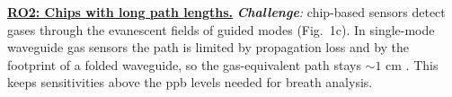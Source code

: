 \documentclass[a4paper,12pt]{article}
\begin{document}
%
%

\underline{\textbf{RO2: Chips with long path lengths.}}
\emph{\textbf{Challenge}:} chip-based sensors detect gases through the
evanescent fields of guided modes (Fig.~1c). In single-mode waveguide gas sensors the path is limited by propagation loss and by the footprint of a folded waveguide, so the gas-equivalent path stays ${\sim}1$ cm \cite{Zhao2022}. This keeps sensitivities above the ppb levels needed for breath analysis.
\end{document}
